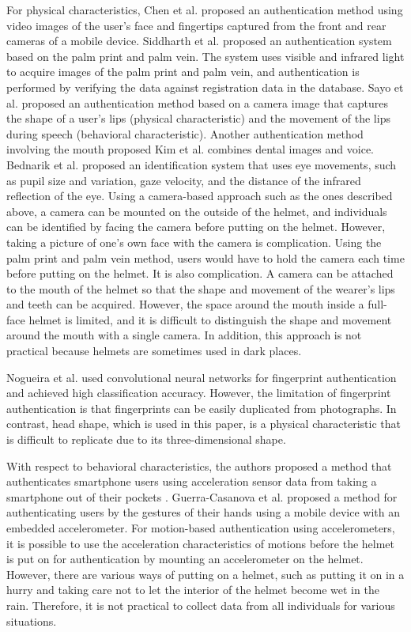 \documentclass[sigchi,authordraft]{acmart}
\begin{document}
For physical characteristics, Chen et al. \cite{face_and_finger} proposed an authentication method using video images of the user's face and fingertips captured from the front and rear cameras of a mobile device. Siddharth et al. \cite{palm_print} proposed an authentication system based on the palm print and palm vein. The system uses visible and infrared light to acquire images of the palm print and palm vein, and authentication is performed by verifying the data against registration data in the database. Sayo et al. \cite{lip_motion} proposed an authentication method based on a camera image that captures the shape of a user's lips (physical characteristic) and the movement of the lips during speech (behavioral characteristic). Another authentication method involving the mouth proposed Kim et al. \cite{teeth_and_voice} combines dental images and voice. Bednarik et al. \cite{eye_movement} proposed an identification system that uses eye movements, such as pupil size and variation, gaze velocity, and the distance of the infrared reflection of the eye. Using a camera-based approach such as the ones described above, a camera can be mounted on the outside of the helmet, and individuals can be identified by facing the camera before putting on the helmet. However, taking a picture of one's own face with the camera is complication. Using the palm print and palm vein method, users would have to hold the camera each time before putting on the helmet. It is also complication. A camera can be attached to the mouth of the helmet so that the shape and movement of the wearer's lips and teeth can be acquired. However, the space around the mouth inside a full-face helmet is limited, and it is difficult to distinguish the shape and movement around the mouth with a single camera. In addition, this approach is not practical because helmets are sometimes used in dark places.\par

Nogueira et al. \cite{finger_CNN} used convolutional neural networks for fingerprint authentication and achieved high classification accuracy. However, the limitation of fingerprint authentication is that fingerprints can be easily duplicated from photographs. In contrast, head shape, which is used in this paper, is a physical characteristic that is difficult to replicate due to its three-dimensional shape.\par

With respect to behavioral characteristics, the authors proposed a method that authenticates smartphone users using acceleration sensor data from taking a smartphone out of their pockets \cite{murao_screen_unlock}. Guerra-Casanova et al. \cite{accelerometer_authentification} proposed a method for authenticating users by the gestures of their hands using a mobile device with an embedded accelerometer. For motion-based authentication using accelerometers, it is possible to use the acceleration characteristics of motions before the helmet is put on for authentication by mounting an accelerometer on the helmet. However, there are various ways of putting on a helmet, such as putting it on in a hurry and taking care not to let the interior of the helmet become wet in the rain. Therefore, it is not practical to collect data from all individuals for various situations.
\end{document}
